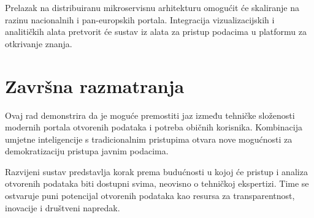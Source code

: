 Prelazak na distribuiranu mikroservisnu arhitekturu omogućit će skaliranje na razinu nacionalnih i pan-europskih portala. Integracija vizualizacijskih i analitičkih alata pretvorit će sustav iz alata za pristup podacima u platformu za otkrivanje znanja.

\section{Završna razmatranja}

Ovaj rad demonstrira da je moguće premostiti jaz između tehničke složenosti modernih portala otvorenih podataka i potreba običnih korisnika. Kombinacija umjetne inteligencije s tradicionalnim pristupima otvara nove mogućnosti za demokratizaciju pristupa javnim podacima.

Razvijeni sustav predstavlja korak prema budućnosti u kojoj će pristup i analiza otvorenih podataka biti dostupni svima, neovisno o tehničkoj ekspertizi. Time se ostvaruje puni potencijal otvorenih podataka kao resursa za transparentnost, inovacije i društveni napredak. 